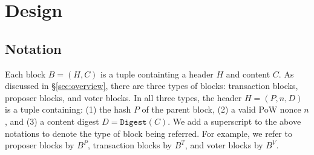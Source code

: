 \chapter{Design}
\label{sec:design}


\section{Notation}
\label{sec:blocktypes}
Each block $B=(H,C)$ is a tuple containting a header $H$ and content $C$.
As discussed in  \S\ref{sec:overview}, there are three types of blocks: transaction blocks, proposer blocks,  and voter blocks.
In all three types, the header $H=(P, n, D)$ is a tuple containing: (1) the hash $P$ of the parent block,
(2)  a valid PoW nonce $n$, and (3) a content digest $D=\texttt{Digest}(C)$. %
We add a superscript to the above notations to denote the type of block being referred. 
For example, we refer  to proposer blocks by $B^P$, transaction blocks by $B^T$, and voter blocks by $B^V$.





